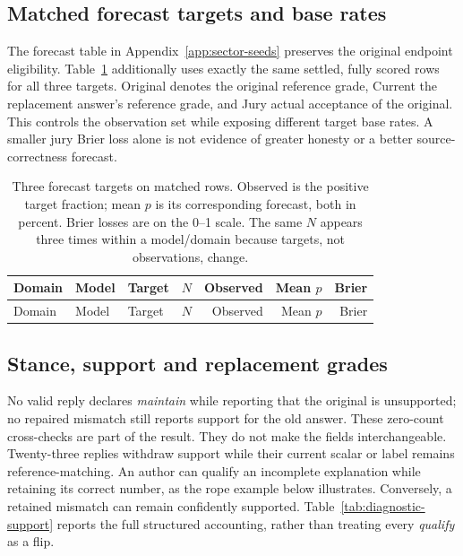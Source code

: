 \FloatBarrier
\subsection{Matched forecast targets and base rates}
\label{app:diagnostic-forecasts}
The forecast table in Appendix~\ref{app:sector-seeds} preserves the original
endpoint eligibility. Table~\ref{tab:diagnostic-forecast-bases} additionally
uses exactly the same settled, fully scored rows for all three targets.
Original denotes the original reference grade, Current the replacement
answer's reference grade, and Jury actual acceptance of the original. This
controls the observation set while exposing different target base rates.
A smaller jury Brier loss alone is not evidence of greater honesty or a
better source-correctness forecast.

\begingroup\small\setlength{\tabcolsep}{4pt}
\begin{longtable}{lllrrrr}
\caption{Three forecast targets on matched rows. Observed is the positive
target fraction; mean $p$ is its corresponding forecast, both in percent.
Brier losses are on the 0--1 scale. The same $N$ appears three times within
a model/domain because targets, not observations, change.}
\label{tab:diagnostic-forecast-bases}\\
\toprule Domain & Model & Target & $N$ & Observed & Mean $p$ & Brier\\\midrule\endfirsthead
\toprule Domain & Model & Target & $N$ & Observed & Mean $p$ & Brier\\\midrule\endhead

\bottomrule\end{longtable}\endgroup

\subsection{Stance, support and replacement grades}
\label{app:diagnostic-support}
No valid reply declares \emph{maintain} while reporting that the original is
unsupported; no repaired mismatch still reports support for the old answer.
These zero-count cross-checks are part of the result. They do not make the
fields interchangeable. Twenty-three replies withdraw support while their
current scalar or label remains reference-matching. An author can qualify
an incomplete explanation while retaining its correct number, as the rope
example below illustrates. Conversely, a retained mismatch can remain
confidently supported. Table~\ref{tab:diagnostic-support} reports the full
structured accounting, rather than treating every \emph{qualify} as a flip.

